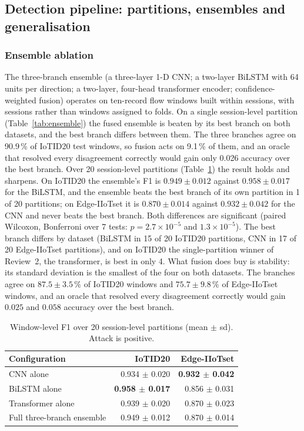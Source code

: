 \subsection{Detection pipeline: partitions, ensembles and generalisation}\label{sec:pipeline}
\subsubsection{Ensemble ablation}
The three-branch ensemble (a three-layer 1-D CNN; a two-layer BiLSTM with 64 units per direction; a two-layer, four-head transformer encoder; confidence-weighted fusion) operates on ten-record flow windows built within sessions, with sessions rather than windows assigned to folds. On a single session-level partition (Table~\ref{tab:ensemble}) the fused ensemble is beaten by its best branch on both datasets, and the best branch differs between them. The three branches agree on 90.9\,\% of IoTID20 test windows, so fusion acts on 9.1\,\% of them, and an oracle that resolved every disagreement correctly would gain only 0.026 accuracy over the best branch. Over 20 session-level partitions (Table~\ref{tab:ensemble20}) the result holds and sharpens. On IoTID20 the ensemble's F1 is $0.949 \pm 0.012$ against $0.958 \pm 0.017$ for the BiLSTM, and the ensemble beats the best branch of its own partition in 1 of 20 partitions; on Edge-IIoTset it is $0.870 \pm 0.014$ against $0.932 \pm 0.042$ for the CNN and never beats the best branch. Both differences are significant (paired Wilcoxon, Bonferroni over 7 tests: $p = 2.7\times10^{-5}$ and $1.3\times10^{-5}$). The best branch differs by dataset (BiLSTM in 15 of 20 IoTID20 partitions, CNN in 17 of 20 Edge-IIoTset partitions), and on IoTID20 the single-partition winner of Review~2, the transformer, is best in only 4. What fusion does buy is stability: its standard deviation is the smallest of the four on both datasets. The branches agree on $87.5 \pm 3.5\,\%$ of IoTID20 windows and $75.7 \pm 9.8\,\%$ of Edge-IIoTset windows, and an oracle that resolved every disagreement correctly would gain $0.025$ and $0.058$ accuracy over the best branch.

\begin{table}[t]
\caption{Window-level F1 over 20 session-level partitions (mean $\pm$ sd). Attack is positive.}
\label{tab:ensemble20}
\centering\footnotesize
\begin{tabular}{@{}lrr@{}}
\toprule
\textbf{Configuration} & \textbf{IoTID20} & \textbf{Edge-IIoTset} \\
\midrule
CNN alone & 0.934 $\pm$ 0.020 & \textbf{0.932 $\pm$ 0.042} \\
BiLSTM alone & \textbf{0.958 $\pm$ 0.017} & 0.856 $\pm$ 0.031 \\
Transformer alone & 0.939 $\pm$ 0.020 & 0.870 $\pm$ 0.023 \\
Full three-branch ensemble & 0.949 $\pm$ 0.012 & 0.870 $\pm$ 0.014 \\
\bottomrule
\end{tabular}
\end{table}

